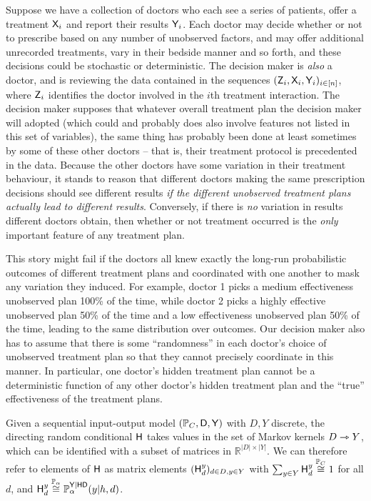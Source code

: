\begin{example}\label{ex:doctor_precedent}
Suppose we have a collection of doctors who each see a series of patients, offer a treatment $\mathsf{X}_i$ and report their results $\mathsf{Y}_i$. Each doctor may decide whether or not to prescribe based on any number of unobserved factors, and may offer additional unrecorded treatments, vary in their bedside manner and so forth, and these decisions could be stochastic or deterministic. The decision maker is \emph{also} a doctor, and is reviewing the data contained in the sequences $(\mathsf{Z}_i,\mathsf{X}_i,\mathsf{Y}_i)_{i\in [n]}$, where $\mathsf{Z}_i$ identifies the doctor involved in the $i$th treatment interaction. The decision maker supposes that whatever overall treatment plan the decision maker will adopted (which could and probably does also involve features not listed in this set of variables), the same thing has probably been done at least sometimes by some of these other doctors -- that is, their treatment protocol is precedented in the data. Because the other doctors have some variation in their treatment behaviour, it stands to reason that different doctors making the same prescription decisions should see different results \emph{if the different unobserved treatment plans actually lead to different results}. Conversely, if there is \emph{no} variation in results different doctors obtain, then whether or not treatment occurred is the \emph{only} important feature of any treatment plan.

This story might fail if the doctors all knew exactly the long-run probabilistic outcomes of different treatment plans and coordinated with one another to mask any variation they induced. For example, doctor 1 picks a medium effectiveness unobserved plan 100\% of the time, while doctor 2 picks a highly effective unobserved plan 50\% of the time and a low effectiveness unobserved plan 50\% of the time, leading to the same distribution over outcomes. Our decision maker also has to assume that there is some ``randomness'' in each doctor's choice of unobserved treatment plan so that they cannot precisely coordinate in this manner. In particular, one doctor's hidden treatment plan cannot be a deterministic function of any other doctor's hidden treatment plan and the ``true'' effectiveness of the treatment plans.
\end{example}


\begin{notation}
Given a sequential input-output model $(\mathbb{P}_C,\mathsf{D},\mathsf{Y})$ with $D,Y$ discrete, the directing random conditional $\mathsf{H}$ takes values in the set of Markov kernels $D\rightarrowtriangle Y$, which can be identified with a subset of matrices in $\mathbb{R}^{|D|\times |Y|}$. We can therefore refer to elements of $\mathsf{H}$ as matrix elements $(\mathsf{H}_d^y)_{d\in D,y\in Y}$ with $\sum_{y\in Y} \mathsf{H}_d^y \overset{\mathbb{P}_C}{\cong} 1$ for all $d$, and $\mathsf{H}_d^y\overset{\mathbb{P}_\alpha}{\cong}\mathbb{P}_\alpha^{\mathsf{Y}|\mathsf{H}\mathsf{D}}(y|h,d)$.
\end{notation}

